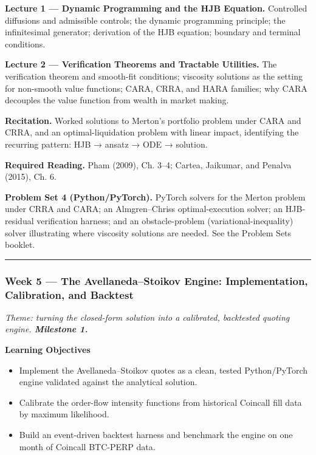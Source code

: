 \documentclass[
]{article}
\providecommand{\tightlist}{%
  \setlength{\itemsep}{0pt}\setlength{\parskip}{0pt}}
\begin{document}
\textbf{Lecture 1 --- Dynamic Programming and the HJB Equation.}
Controlled diffusions and admissible controls; the dynamic programming
principle; the infinitesimal generator; derivation of the HJB equation;
boundary and terminal conditions.

\textbf{Lecture 2 --- Verification Theorems and Tractable Utilities.}
The verification theorem and smooth-fit conditions; viscosity solutions
as the setting for non-smooth value functions; CARA, CRRA, and HARA
families; why CARA decouples the value function from wealth in market
making.

\textbf{Recitation.} Worked solutions to Merton's portfolio problem
under CARA and CRRA, and an optimal-liquidation problem with linear
impact, identifying the recurring pattern: HJB → ansatz → ODE →
solution.

\textbf{Required Reading.} Pham (2009), Ch. 3--4; Cartea, Jaikumar, and
Penalva (2015), Ch. 6.

\textbf{Problem Set 4 (Python/PyTorch).} PyTorch solvers for the Merton
problem under CRRA and CARA; an Almgren--Chriss optimal-execution
solver; an HJB-residual verification harness; and an obstacle-problem
(variational-inequality) solver illustrating where viscosity solutions
are needed. See the Problem Sets booklet.

\begin{center}\rule{0.5\linewidth}{0.5pt}\end{center}

\subsubsection{Week 5 --- The Avellaneda--Stoikov Engine:
Implementation, Calibration, and
Backtest}\label{week-5-the-avellanedastoikov-engine-implementation-calibration-and-backtest}

\emph{Theme: turning the closed-form solution into a calibrated,
backtested quoting engine. \textbf{Milestone 1.}}

\textbf{Learning Objectives}

\begin{itemize}
\tightlist
\item
  Implement the Avellaneda--Stoikov quotes as a clean, tested
  Python/PyTorch engine validated against the analytical solution.
\item
  Calibrate the order-flow intensity functions from historical Coincall
  fill data by maximum likelihood.
\item
  Build an event-driven backtest harness and benchmark the engine on one
  month of Coincall BTC-PERP data.
\end{itemize}
\end{document}
